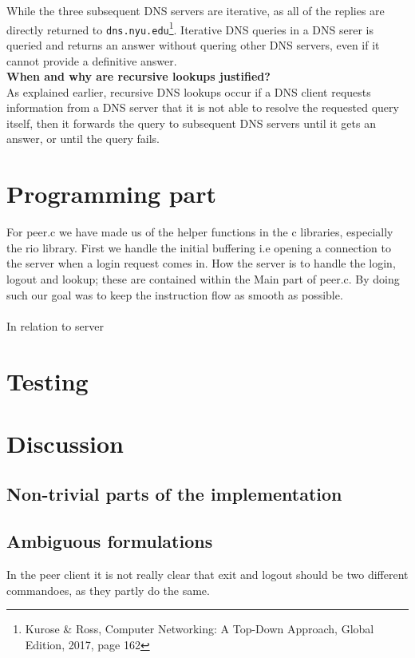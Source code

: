 \documentclass[12pt,a4paper]{article}
\begin{document}
\noindent While the three subsequent DNS servers are iterative, as all of the replies are directly returned to \verb|dns.nyu.edu|\footnote{Kurose \& Ross, Computer Networking: A Top-Down Approach, Global Edition, 2017, page 162}. Iterative DNS queries in a DNS serer is queried and returns an answer without quering other DNS servers, even if it cannot provide a definitive answer.\\

\noindent\textbf{When and why are recursive lookups justified?}\\
As explained earlier, recursive DNS lookups occur if a DNS client requests information from a DNS server that it is not able to resolve the requested query itself, then it forwards the query to subsequent DNS servers until it gets an answer, or until the query fails. 

\clearpage

\section{Programming part}
For peer.c we have made us of the helper functions in the c libraries, especially the rio library. 
First we handle the initial buffering i.e opening a connection to the server when a login request comes in. How the server is to handle the login, logout and lookup; these are contained within the Main part of peer.c. By doing such our goal was to keep the instruction flow as smooth as possible. \\
\\

In relation to server
\section{Testing}

\section{Discussion}
\subsection{Non-trivial parts of the implementation}


\subsection{Ambiguous formulations}
In the peer client it is not really clear that exit and logout should be two different commandoes, as they partly do the same.\\
\end{document}
